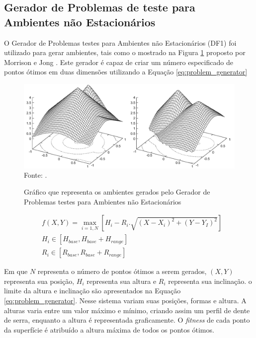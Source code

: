 \subsection{Gerador de Problemas de teste para Ambientes não Estacionários}
\label{sec:df1_generator}

O Gerador de Problemas testes para Ambientes não Estacionários (DF1) foi utilizado para gerar ambientes, tais como o mostrado na Figura \ref{fig:problem_generator} proposto por Morrison e Jong \cite{morrison1999test}. Este gerador é capaz de criar um número especificado de pontos ótimos em duas dimensões utilizando a Equação \ref{eq:problem_generator} 

\begin{figure}[!htb]
	\caption{Gráfico que representa os ambientes gerados pelo Gerador de Problemas testes para Ambientes não Estacionários}
	\centering
	\includegraphics[scale=0.31]{images/bm_generator.png}
	\label{fig:problem_generator}{\\Fonte: .}
\end{figure}

\begin{equation}
\label{eq:problem_generator}
\begin{split}
& f(X,Y) = \max_{i=1,N}\left[H_i - R_i . \sqrt{(X - X_i)^2 + (Y - Y_I)^2}\right] \\
& H_i \in [H_{base}, H_{base} + H_{range}] \\
& R_i \in [R_{base}, R_{base} + R_{range}]
\end{split}
\end{equation}

\noindent Em que $N$ representa o número de pontos ótimos a serem gerados, $(X,Y)$ representa sua posição, $H_i$ representa sua altura e $R_i$ representa sua inclinação. o limite da altura e inclinação são apresentados na Equação \ref{eq:problem_generator}. Nesse sistema variam suas posições, formas e altura. A alturas varia entre um valor máximo e mínimo, criando assim um perfil de dente de serra, enquanto a altura é representada graficamente. O \textit{fitness} de cada ponto da superfície é atribuído a altura máxima de todos os pontos ótimos.

